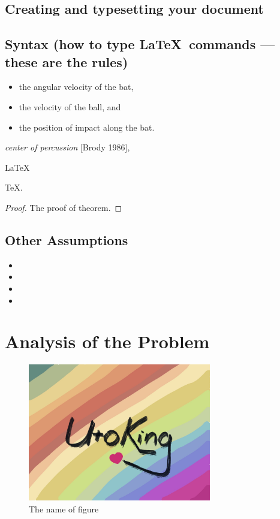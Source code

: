\documentclass{mcmthesis}
\begin{document}
\subsection{Creating and typesetting your document}

\subsection{Syntax (how to type \LaTeX\ commands --- these
  are the rules)}

\lipsum[3]
\begin{itemize}
\item the angular velocity of the bat,
\item the velocity of the ball, and
\item the position of impact along the bat.
\end{itemize}
\lipsum[4]
\emph{center of percussion} [Brody 1986], \lipsum[5]

\begin{Theorem} \label{thm:latex}
\LaTeX
\end{Theorem}
\begin{Lemma} \label{thm:tex}
\TeX.
\end{Lemma}
\begin{proof}
The proof of theorem.
\end{proof}

\subsection{Other Assumptions}
\lipsum[6]
\begin{itemize}
\item
\item
\item
\item
\end{itemize}

\lipsum[7]

\section{Analysis of the Problem}
\begin{figure}[h]
\small
\centering
\includegraphics[width=8cm]{./figures/utoking.jpeg}
\caption{The name of figure} \label{fig:aa}
\end{figure}
\end{document}
